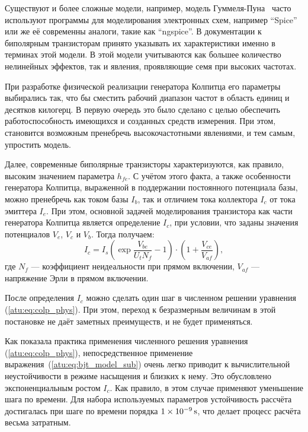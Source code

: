 Существуют и более сложные модели, например,
модель Гуммеля-Пуна~\cite{gummel_poon_1970,shiskin_electronnie_pribori}
часто используют программы для моделирования электронных схем, например ``Spice''
или же её современны аналоги, такие как ``ngspice''.
В документации к биполярным транзисторам принято указывать их характеристики
именно в терминах этой модели.
В этой модели учитываются как большее количество нелинейных
эффектов, так и явления, проявляющие семя при высоких частотах.

При разработке физической реализации генератора Колпитца
его параметры выбирались так, что бы сместить рабочий диапазон частот
в область единиц и десятков килогерц. В первую очередь это было сделано с целью
обеспечить работоспособность имеющихся и созданных средств измерения.
При этом, становится возможным пренебречь высокочастотными явлениями,
и тем самым, упростить модель.

Далее, современные биполярные транзисторы характеризуются, как правило,
высоким значением параметра $h_{fe}$.
С учётом этого факта, а также особенности генератора Колпитца, выраженной
в поддержании постоянного потенциала базы, можно пренебречь
как током базы $I_b$, так и отличием тока коллектора $I_c$
от тока эмиттера $I_e$.
При этом, основной задачей моделирования транзистора как части генератора Колпитца
является определение $I_c$, при условии, что заданы
значения потенциалов $V_e$, $V_c$ и $V_b$.
Тогда получаем:
%
\begin{equation}
  I_c
  = I_s \left( \exp\frac{V_{be}}{U_t N_f} - 1 \right)
    \cdot
    \left( 1 + \frac{V_{ce}}{V_{af}}\right),
  \label{atu:eq:bjt_model_sub}
\end{equation}
%
где
$N_f$ --- коэффициент неидеальности при прямом включении,
$V_{af} $ --- напряжение Эрли в прямом включении.

После определения $I_c$ можно сделать один шаг
в численном решении уравнения
(\ref{atu:eq:colp_phys}).
При этом, переход к безразмерным величинам
в этой постановке не даёт заметных преимуществ,
и не будет применяться.

Как показала практика применения численного решения
уравнения (\ref{atu:eq:colp_phys}),
непосредственное применение выражения~(\ref{atu:eq:bjt_model_sub})
очень легко приводит к вычислительной неустойчивости
в режиме насыщения и близких к нему.
Это обусловлено экспоненциальным ростом $I_c$.
Как правило, в этом случае применяют уменьшение шага по времени.
Для набора используемых параметров устойчивость рассчёта
достигалась при шаге по времени порядка $ \SI{1E-9}{\second}$,
что делает процесс расчёта весьма затратным.

